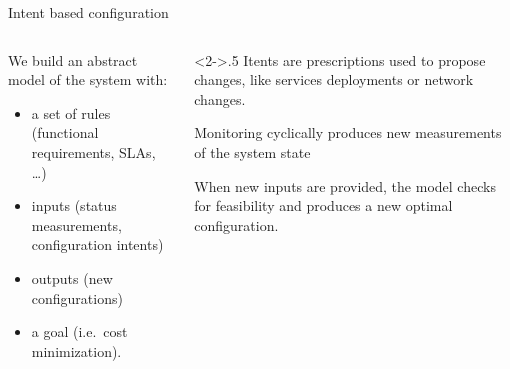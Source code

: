\documentclass[xcolor={usenames,dvipsnames,svgnames}]{beamer}
\begin{document}
\begin{frame}{Intent based configuration}
	\begin{columns}
		\begin{column}{.5\textwidth}
			We build an \alert{abstract model} of the system with:
			\begin{itemize}
				\item a set of \alert{rules} (functional requirements, \glspl{SLA}, \ldots)
				\item \alert{inputs} (status measurements, configuration intents)
				\item \alert{outputs} (new configurations)
				\item a \alert{goal} (i.e.\ cost minimization).
			\end{itemize}
		\end{column}
		\begin{column}<2->{.5\textwidth}
			\alert{Itents} are prescriptions used to propose changes, like services deployments or network changes. \vspace{1em}

			\alert{Monitoring} cyclically produces new measurements of the system state \vspace{1em}

			When new inputs are provided, the model checks for \alert{feasibility} and produces a new \alert{optimal configuration}.
		\end{column}
	\end{columns}
\end{frame}


% 		
\end{document}
